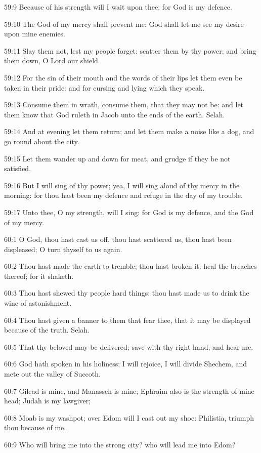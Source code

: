 59:9 Because of his strength will I wait upon thee: for God is my defence.

59:10 The God of my mercy shall prevent me: God shall let me see my desire upon mine enemies.

59:11 Slay them not, lest my people forget: scatter them by thy power; and bring them down, O Lord our shield.

59:12 For the sin of their mouth and the words of their lips let them even be taken in their pride: and for cursing and lying which they speak.

59:13 Consume them in wrath, consume them, that they may not be: and let them know that God ruleth in Jacob unto the ends of the earth.  Selah.

59:14 And at evening let them return; and let them make a noise like a dog, and go round about the city.

59:15 Let them wander up and down for meat, and grudge if they be not satisfied.

59:16 But I will sing of thy power; yea, I will sing aloud of thy mercy in the morning: for thou hast been my defence and refuge in the day of my trouble.

59:17 Unto thee, O my strength, will I sing: for God is my defence, and the God of my mercy.



60:1 O God, thou hast cast us off, thou hast scattered us, thou hast been displeased; O turn thyself to us again.

60:2 Thou hast made the earth to tremble; thou hast broken it: heal the breaches thereof; for it shaketh.

60:3 Thou hast shewed thy people hard things: thou hast made us to drink the wine of astonishment.

60:4 Thou hast given a banner to them that fear thee, that it may be displayed because of the truth. Selah.

60:5 That thy beloved may be delivered; save with thy right hand, and hear me.

60:6 God hath spoken in his holiness; I will rejoice, I will divide Shechem, and mete out the valley of Succoth.

60:7 Gilead is mine, and Manasseh is mine; Ephraim also is the strength of mine head; Judah is my lawgiver;

60:8 Moab is my washpot; over Edom will I cast out my shoe: Philistia, triumph thou because of me.

60:9 Who will bring me into the strong city? who will lead me into Edom?

